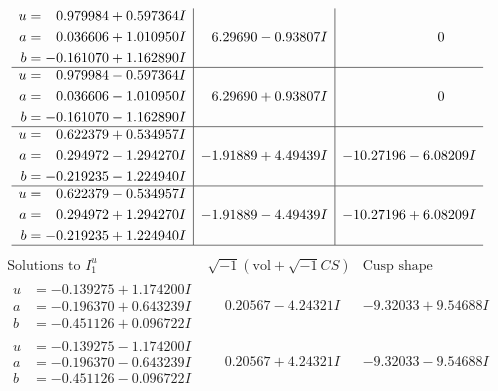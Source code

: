 \documentclass[1p]{elsarticle_modified}
\theoremstyle{definition}
\newcommand{\I}{\sqrt{-1}}
\begin{document}
$$\begin{array}{c|c|c}
\begin{aligned}
u &= \phantom{-}0.979984 + 0.597364 I \\
a &= \phantom{-}0.036606 + 1.010950 I \\
b &= -0.161070 + 1.162890 I\end{aligned}
 & \phantom{-}6.29690 - 0.93807 I & \phantom{-0.000000 } 0 \\ \hline\begin{aligned}
u &= \phantom{-}0.979984 - 0.597364 I \\
a &= \phantom{-}0.036606 - 1.010950 I \\
b &= -0.161070 - 1.162890 I\end{aligned}
 & \phantom{-}6.29690 + 0.93807 I & \phantom{-0.000000 } 0 \\ \hline\begin{aligned}
u &= \phantom{-}0.622379 + 0.534957 I \\
a &= \phantom{-}0.294972 - 1.294270 I \\
b &= -0.219235 - 1.224940 I\end{aligned}
 & -1.91889 + 4.49439 I & -10.27196 - 6.08209 I \\ \hline\begin{aligned}
u &= \phantom{-}0.622379 - 0.534957 I \\
a &= \phantom{-}0.294972 + 1.294270 I \\
b &= -0.219235 + 1.224940 I\end{aligned}
 & -1.91889 - 4.49439 I & -10.27196 + 6.08209 I\\
 \hline 
 \end{array}$$\newpage$$\begin{array}{c|c|c}  
\text{Solutions to }I^u_{1}& \I (\text{vol} + \sqrt{-1}CS) & \text{Cusp shape}\\
 \hline 
\begin{aligned}
u &= -0.139275 + 1.174200 I \\
a &= -0.196370 + 0.643239 I \\
b &= -0.451126 + 0.096722 I\end{aligned}
 & \phantom{-}0.20567 - 4.24321 I & -9.32033 + 9.54688 I \\ \hline\begin{aligned}
u &= -0.139275 - 1.174200 I \\
a &= -0.196370 - 0.643239 I \\
b &= -0.451126 - 0.096722 I\end{aligned}
 & \phantom{-}0.20567 + 4.24321 I & -9.32033 - 9.54688 I \\ \hline\begin{aligned}

\end{aligned}
\end{array}$$
\end{document}
